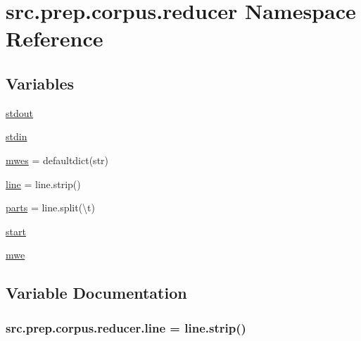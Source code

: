 \hypertarget{namespacesrc_1_1prep_1_1corpus_1_1reducer}{}\section{src.\+prep.\+corpus.\+reducer Namespace Reference}
\label{namespacesrc_1_1prep_1_1corpus_1_1reducer}
\subsection*{Variables}
\begin{DoxyCompactItemize}
\item 
\hyperlink{namespacesrc_1_1prep_1_1corpus_1_1reducer_a263ef9a028ff54adf5571cc42e524c7e}{stdout}
\item 
\hyperlink{namespacesrc_1_1prep_1_1corpus_1_1reducer_a2afc0a231d39d2b2153ef5d5c39474a5}{stdin}
\item 
\hyperlink{namespacesrc_1_1prep_1_1corpus_1_1reducer_adbb66bc5e3d26608ec8fcdf0fd842191}{mwes} = defaultdict(str)
\item 
\hyperlink{namespacesrc_1_1prep_1_1corpus_1_1reducer_aa48578a3607078fcafebbc5b9475a0e4}{line} = line.\+strip()
\item 
\hyperlink{namespacesrc_1_1prep_1_1corpus_1_1reducer_a33fe1834d5b446888601827c172b4225}{parts} = line.\+split(\textquotesingle{}\textbackslash{}t\textquotesingle{})
\item 
\hyperlink{namespacesrc_1_1prep_1_1corpus_1_1reducer_af9470a4740757b38e1ec5a5fd110742c}{start}
\item 
\hyperlink{namespacesrc_1_1prep_1_1corpus_1_1reducer_ada692c8a642db5ce8faeacbb0a86c01d}{mwe}
\end{DoxyCompactItemize}


\subsection{Variable Documentation}
\subsubsection[{\texorpdfstring{line}{line}}]{\setlength{\rightskip}{0pt plus 5cm}src.\+prep.\+corpus.\+reducer.\+line = line.\+strip()}\hypertarget{namespacesrc_1_1prep_1_1corpus_1_1reducer_aa48578a3607078fcafebbc5b9475a0e4}{}\label{namespacesrc_1_1prep_1_1corpus_1_1reducer_aa48578a3607078fcafebbc5b9475a0e4}
